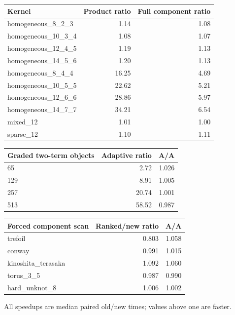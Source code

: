 \begin{center}
\begin{tabular}{@{}lrr@{}}
\toprule
Kernel & Product ratio & Full component ratio \\
\midrule
homogeneous\_8\_2\_3 & 1.14 & 1.08 \\
homogeneous\_10\_3\_4 & 1.08 & 1.07 \\
homogeneous\_12\_4\_5 & 1.19 & 1.13 \\
homogeneous\_14\_5\_6 & 1.20 & 1.13 \\
homogeneous\_8\_4\_4 & 16.25 & 4.69 \\
homogeneous\_10\_5\_5 & 22.62 & 5.21 \\
homogeneous\_12\_6\_6 & 28.86 & 5.97 \\
homogeneous\_14\_7\_7 & 34.21 & 6.54 \\
mixed\_12 & 1.01 & 1.00 \\
sparse\_12 & 1.10 & 1.11 \\
\bottomrule
\end{tabular}
\end{center}
\begin{center}
\begin{tabular}{@{}lrr@{}}
\toprule
Graded two-term objects & Adaptive ratio & A/A \\
\midrule
65 & 2.72 & 1.026 \\
129 & 8.91 & 1.005 \\
257 & 20.74 & 1.001 \\
513 & 58.52 & 0.987 \\
\bottomrule
\end{tabular}
\end{center}
\begin{center}
\begin{tabular}{@{}lrr@{}}
\toprule
Forced component scan & Ranked/new ratio & A/A \\
\midrule
trefoil & 0.803 & 1.058 \\
conway & 0.991 & 1.015 \\
kinoshita\_terasaka & 1.092 & 1.060 \\
torus\_3\_5 & 0.987 & 0.990 \\
hard\_unknot\_8 & 1.006 & 1.002 \\
\bottomrule
\end{tabular}
\end{center}
All speedups are median paired old/new times; values above one are faster.
